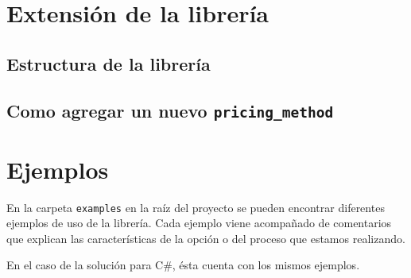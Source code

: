 \documentclass[12pt,a4paper,final]{article}
\begin{document}
\section{Extensión de la librería}
	\subsection{Estructura de la librería}
	\subsection{Como agregar un nuevo \texttt{pricing\_method}}

\section{Ejemplos}
	En la carpeta \texttt{examples} en la raíz del proyecto se pueden encontrar diferentes ejemplos
	de uso de la librería. Cada ejemplo viene acompañado de comentarios que explican las características
	de la opción o del proceso que estamos realizando.
	
	En el caso de la solución para C\#, ésta cuenta con los mismos ejemplos.	
\printindex
\end{document}
